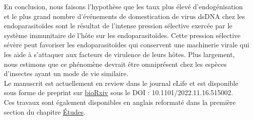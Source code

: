 En conclusion, nous faisons l'hypothèse que les taux plus élevé d'endogénisation et le plus grand nombre d'événements de domestication de virus dsDNA chez les endoparasitoïdes sont le résultat de l'intense pression sélective exercée par le système immunitaire de l'hôte sur les endoparasitoïdes. Cette pression sélective sévère peut favoriser les endoparasitoïdes qui conservent une machinerie virale qui les aide à s'attaquer aux facteurs de virulence de leurs hôtes. Plus largement, nous estimons que ce phénomène devrait être omniprésent chez les espèces d'insectes ayant un mode de vie similaire.\\


Le manuscrit est actuellement en review dans le journal eLife et est disponible sous forme de preprint sur \href{https://doi.org/10.1101/2022.11.16.515002}{bioRxiv} sous le DOI : 10.1101/2022.11.16.515002.\\

Ces travaux sont également disponibles en anglais reformaté dans la première section du chapitre \hyperref[sec:chap1]{Études}. 
